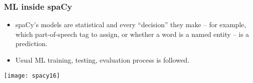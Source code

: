 \begin{frame}[fragile]\frametitle{ML inside spaCy}

\begin{itemize}
\item spaCy’s models are statistical and every “decision” they make – for example, which part-of-speech tag to assign, or whether a word is a named entity – is a prediction. 
\item Usual ML training, testing, evaluation process is followed.
\end{itemize}

\begin{center}
\texttt{[image: spacy16]}
\end{center}


\end{frame}
